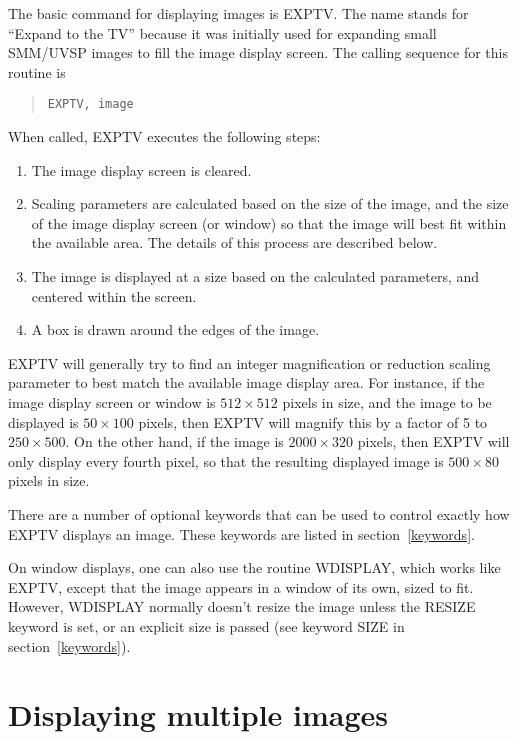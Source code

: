 The basic command for displaying images is EXPTV.  The name stands for ``Expand
to the TV'' because it was initially used for expanding small SMM/UVSP images
to fill the image display screen.  The calling sequence for this routine is
\begin{quote}
\begin{verbatim}
EXPTV, image
\end{verbatim}
\end{quote}
When called, EXPTV executes the following steps:
\begin{enumerate}
\item
The image display screen is cleared.
\item
Scaling parameters are calculated based on the size of the image, and the size
of the image display screen (or window) so that the image will best fit within
the available area.  The details of this process are described below.
\item
The image is displayed at a size based on the calculated parameters, and
centered within the screen.
\item
A box is drawn around the edges of the image.
\end{enumerate}

EXPTV will generally try to find an integer magnification or reduction scaling
parameter to best match the available image display area.  For instance, if the
image display screen or window is \mbox{$512 \times 512$} pixels in size, and
the image to be displayed is \mbox{$50 \times 100$} pixels, then EXPTV will
magnify this by a factor of 5 to \mbox{$250 \times 500$}.  On the other hand,
if the image is \mbox{$2000 \times 320$} pixels, then EXPTV will only display
every fourth pixel, so that the resulting displayed image is \mbox{$500 \times
80$} pixels in size.

There are a number of optional keywords that can be used to control exactly how
EXPTV displays an image.  These keywords are listed in section~\ref{keywords}.

On window displays, one can also use the routine WDISPLAY, which works like
EXPTV, except that the image appears in a window of its own, sized to fit.
However, WDISPLAY normally doesn't resize the image unless the RESIZE keyword
is set, or an explicit size is passed (see keyword SIZE in
section~\ref{keywords}).

\section{Displaying multiple images}

